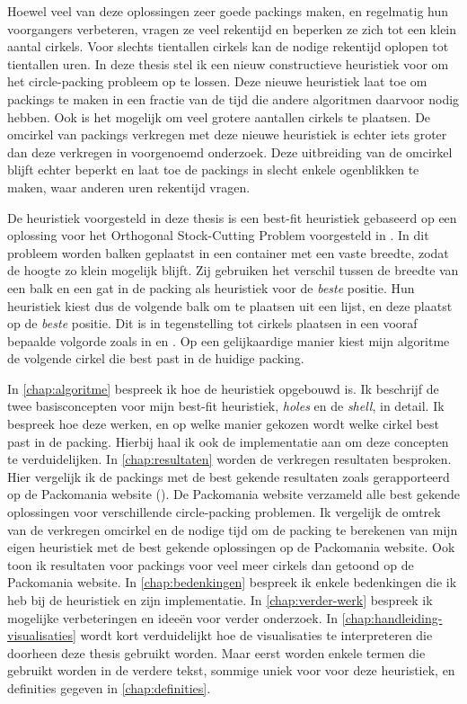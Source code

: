 \documentclass[12pt,a4paper,oneside]{book}
\begin{document}
Hoewel veel van deze oplossingen zeer goede packings maken, en regelmatig hun voorgangers verbeteren, vragen ze veel rekentijd en beperken ze zich tot een klein aantal cirkels.
Voor slechts tientallen cirkels kan de nodige rekentijd oplopen tot tientallen uren.
In deze thesis stel ik een nieuw constructieve heuristiek voor om het circle-packing probleem op te lossen.
Deze nieuwe heuristiek laat toe om packings te maken in een fractie van de tijd die andere algoritmen daarvoor nodig hebben.
Ook is het mogelijk om veel grotere aantallen cirkels te plaatsen.
De omcirkel van packings verkregen met deze nieuwe heuristiek is echter iets groter dan deze verkregen in voorgenoemd onderzoek.
Deze uitbreiding van de omcirkel blijft echter beperkt en laat toe de packings in slecht enkele ogenblikken te maken, waar anderen uren rekentijd vragen.

De heuristiek voorgesteld in deze thesis is een best-fit heuristiek gebaseerd op een oplossing voor het Orthogonal Stock-Cutting Problem voorgesteld in \cite{burke2004new}.
In dit probleem worden balken geplaatst in een container met een vaste breedte, zodat de hoogte zo klein mogelijk blijft.
Zij gebruiken het verschil tussen de breedte van een balk en een gat in de packing als heuristiek voor de \textit{beste} positie.
Hun heuristiek kiest dus de volgende balk om te plaatsen uit een lijst, en deze plaatst op de \textit{beste} positie.
Dit is in tegenstelling tot cirkels plaatsen in een vooraf bepaalde volgorde zoals in \cite{grosso2010} en \cite{jors2011}.
Op een gelijkaardige manier kiest mijn algoritme de volgende cirkel die best past in de huidige packing.

In \autoref{chap:algoritme} bespreek ik hoe de heuristiek opgebouwd is.
Ik beschrijf de twee basisconcepten voor mijn best-fit heuristiek, \textit{holes} en de \textit{shell}, in detail.
Ik bespreek hoe deze werken, en op welke manier gekozen wordt welke cirkel best past in de packing.
Hierbij haal ik ook de implementatie aan om deze concepten te verduidelijken.
In \autoref{chap:resultaten} worden de verkregen resultaten besproken.
Hier vergelijk ik de packings met de best gekende resultaten zoals gerapporteerd op de Packomania website (\cite{packomania}).
De Packomania website verzameld alle best gekende oplossingen voor verschillende circle-packing problemen.
Ik vergelijk de omtrek van de verkregen omcirkel en de nodige tijd om de packing te berekenen van mijn eigen heuristiek met de best gekende oplossingen op de Packomania website.
Ook toon ik resultaten voor packings voor veel meer cirkels dan getoond op de Packomania website.
In \autoref{chap:bedenkingen} bespreek ik enkele bedenkingen die ik heb bij de heuristiek en zijn implementatie.
In \autoref{chap:verder-werk} bespreek ik mogelijke verbeteringen en ideeën voor verder onderzoek.
In \autoref{chap:handleiding-visualisaties} wordt kort verduidelijkt hoe de visualisaties te interpreteren die doorheen deze thesis gebruikt worden.
Maar eerst worden enkele termen die gebruikt worden in de verdere tekst, sommige uniek voor voor deze heuristiek, en definities gegeven in \autoref{chap:definities}.
\end{document}
